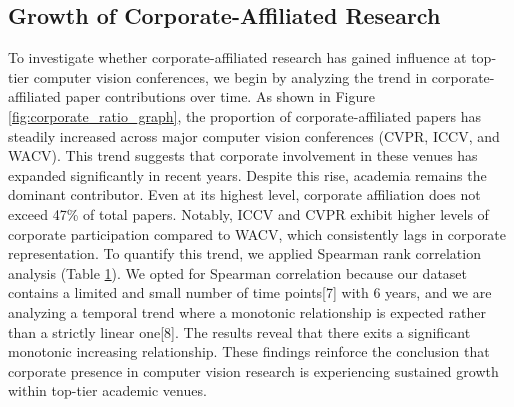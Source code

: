 \documentclass{article}
\begin{document}
\subsection{Growth of Corporate-Affiliated Research}
\vspace{-7pt}
To investigate whether corporate-affiliated research has gained influence at top-tier computer vision conferences, we begin by analyzing the trend in corporate-affiliated paper contributions over time. As shown in Figure \ref{fig:corporate_ratio_graph}, the proportion of corporate-affiliated papers has steadily increased across major computer vision conferences (CVPR, ICCV, and WACV). This trend suggests that corporate involvement in these venues has expanded significantly in recent years. Despite this rise, academia remains the dominant contributor. Even at its highest level, corporate affiliation does not exceed 47\% of total papers. Notably, ICCV and CVPR exhibit higher levels of corporate participation compared to WACV, which consistently lags in corporate representation. To quantify this trend, we applied Spearman rank correlation analysis (Table \hyperlink{tab:spearman_results}{1}). We opted for Spearman correlation because our dataset contains a limited and small number of time points[7] with 6 years, and we are analyzing a temporal trend where a monotonic relationship is expected rather than a strictly linear one[8]. The results reveal that there exits a significant monotonic increasing relationship. These findings reinforce the conclusion that corporate presence in computer vision research is experiencing sustained growth within top-tier academic venues.
\vspace{-2pt}

\end{document}

